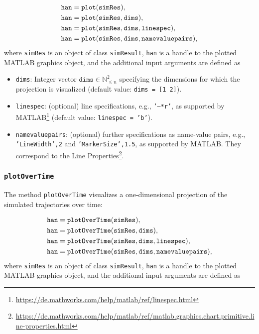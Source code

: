 \begin{equation*}
	\begin{split}
		&\texttt{han} = {\normalfont \texttt{plot}}(\texttt{simRes}), \\
		&\texttt{han} = {\normalfont \texttt{plot}}(\texttt{simRes},\texttt{dims}), \\
		&\texttt{han} = {\normalfont \texttt{plot}}(\texttt{simRes},\texttt{dims},\texttt{linespec}), \\
		&\texttt{han} = {\normalfont \texttt{plot}}(\texttt{simRes},\texttt{dims},\texttt{namevaluepairs}),
	\end{split}
\end{equation*}
where \texttt{simRes} is an object of class \texttt{simResult}, \texttt{han} is a handle to the plotted MATLAB graphics object, and the additional input arguments are defined as

\begin{itemize}
	\item \texttt{dims}: Integer vector $\texttt{dims} \in \mathbb{N}_{\leq n}^2$ specifying the dimensions for which the projection is visualized (default value: \texttt{dims = [1 2]}).
	\item \texttt{linespec}: (optional) line specifications, e.g., \texttt{'--*r'}, as supported by MATLAB\footnote{\url{https://de.mathworks.com/help/matlab/ref/linespec.html}} (default value: \texttt{linespec = 'b'}).
	\item \texttt{namevaluepairs}: (optional) further specifications as name-value pairs, e.g.,
	\texttt{'LineWidth',2} and \texttt{'MarkerSize',1.5}, as supported by MATLAB.
	They correspond to the Line Properties\footnote{\url{https://de.mathworks.com/help/matlab/ref/matlab.graphics.chart.primitive.line-properties.html}}.
\end{itemize}


\subsubsection{\texttt{plotOverTime}}

The method \texttt{plotOverTime} visualizes a one-dimensional projection of the simulated trajectories over time:

\begin{equation*}
	\begin{split}
		&\texttt{han} = {\normalfont \texttt{plotOverTime}}(\texttt{simRes}), \\
		&\texttt{han} = {\normalfont \texttt{plotOverTime}}(\texttt{simRes},\texttt{dims}), \\
		&\texttt{han} = {\normalfont \texttt{plotOverTime}}(\texttt{simRes},\texttt{dims},\texttt{linespec}), \\
		&\texttt{han} = {\normalfont \texttt{plotOverTime}}(\texttt{simRes},\texttt{dims},\texttt{namevaluepairs}),
	\end{split}
\end{equation*}
where \texttt{simRes} is an object of class \texttt{simResult}, \texttt{han} is a handle to the plotted MATLAB graphics object, and the additional input arguments are defined as

